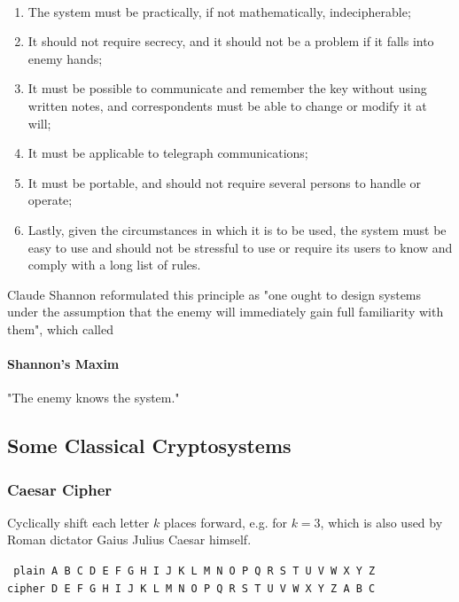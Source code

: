 \documentclass{article}
\begin{document}
\begin{principle}
    \mbox{}\\
    \begin{enumerate}
        \item The system must be practically, if not mathematically, indecipherable;
        \item It should not require secrecy, and it should not be a problem if it falls into enemy hands;
        \item It must be possible to communicate and remember the key without using written notes, and correspondents must be able to change or modify it at will;
        \item It must be applicable to telegraph communications;
        \item It must be portable, and should not require several persons to handle or operate;
        \item Lastly, given the circumstances in which it is to be used, the system must be easy to use and should not be stressful to use or require its users to know and comply with a long list of rules.
    \end{enumerate}
\end{principle}

Claude Shannon reformulated this principle as "one ought to design systems under the assumption that the enemy will immediately gain full familiarity with them", which called

\paragraph{Shannon's Maxim} "The enemy knows the system."

\subsection{Some Classical Cryptosystems}

\subsubsection{Caesar Cipher}

Cyclically shift each letter $k$ places forward, e.g. for $k = 3$, which is also used by Roman dictator Gaius Julius Caesar himself.

\begin{center}
    \texttt{
         plain \quad A B C D E F G H I J K L M N O P Q R S T U V W X Y Z\\
        cipher \quad D E F G H I J K L M N O P Q R S T U V W X Y Z A B C
    }
\end{center}
\end{document}
